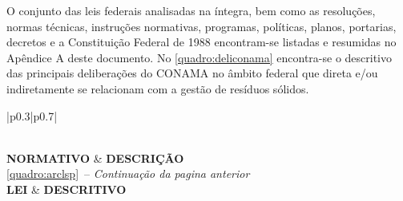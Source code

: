 	O conjunto das leis federais analisadas na íntegra, bem como as resoluções, normas técnicas, instruções normativas, programas, políticas, planos, portarias, decretos e a Constituição Federal de 1988 encontram-se listadas e resumidas no Apêndice A deste documento. 
	No \autoref{quadro:deliconama} encontra-se o descritivo das principais deliberações do CONAMA no âmbito federal que direta e/ou indiretamente se relacionam com a gestão de resíduos sólidos.
	
	\renewcommand\LTcaptype{quadro}
	\begin{center}
		\begin{longtable}{|p{}|p{}|}
			\caption{\label{quadro:deliconama}Principais deliberações do CONAMA no âmbito federal que direta e/ou indiretamente se relacionam com a gestão de resíduos sólidos.}\\
			\hline
			\textbf{NORMATIVO} & \textbf{DESCRIÇÃO} \\
			\hline
			\endfirsthead
			{\quadroname\space\ref{quadro:arclsp}\ -- \textit{Continuação da pagina anterior}} \\
			\hline
			\textbf{LEI} & \textbf{DESCRITIVO}\\
			\hline
			\endhead
			

\end{longtable}
\end{center}
